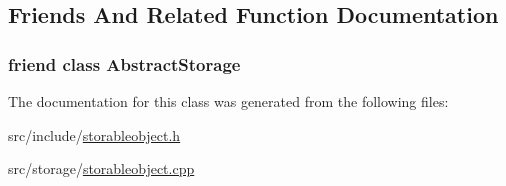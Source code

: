 \subsection{Friends And Related Function Documentation}
\hypertarget{classStorage_1_1StorableObject_a8d384f3e1d366a9f5aa2a8afa3cf96b3}{
\subsubsection[{AbstractStorage}]{\setlength{\rightskip}{0pt plus 5cm}friend class {\bf AbstractStorage}}}
\label{d4/deb/classStorage_1_1StorableObject_a8d384f3e1d366a9f5aa2a8afa3cf96b3}


The documentation for this class was generated from the following files:\begin{DoxyCompactItemize}
\item 
src/include/\hyperlink{storableobject_8h}{storableobject.h}\item 
src/storage/\hyperlink{storableobject_8cpp}{storableobject.cpp}\end{DoxyCompactItemize}
